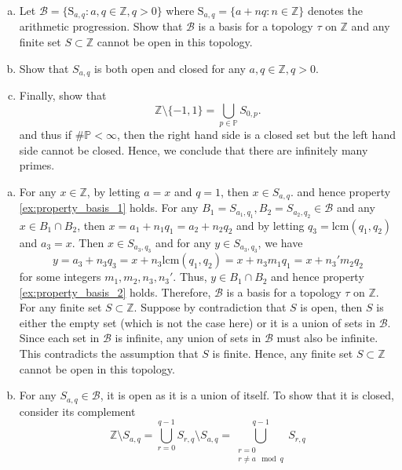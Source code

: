 \documentclass{elegantbook}
\begin{document}
\begin{problemset}[Exercises]
  \begin{enumerate}[(a)]
    \item Let $\mathcal{B} = \{\mathrm{S}_{a, q}: a, q \in \mathbb{Z}, q > 0\}$ where $\mathrm{S}_{a, q} = \{a + nq: n \in \mathbb{Z}\}$ denotes the arithmetic progression. Show that $\mathcal{B}$ is a basis for a topology $\tau$ on $\mathbb{Z}$ and any finite set $S \subset \mathbb{Z}$ cannot be open in this topology.
    \item Show that $S_{a,q}$ is both open and closed for any $a, q \in \mathbb{Z}, q > 0$.
    \item Finally, show that
    \[
      \mathbb{Z} \setminus \{-1, 1\} = \bigcup_{p \in \mathbb{P}} S_{0, p}.
    \]
    and thus if $\#\mathbb{P}<\infty$, then the right hand side is a closed set but the left hand side cannot be closed. Hence, we conclude that there are infinitely many primes.
  \end{enumerate}
  \begin{solution}
    \begin{enumerate}[(a)]
      \item For any $x \in \mathbb{Z}$, by letting $a = x$ and $q = 1$, then $x \in S_{a, q}$. and hence property \ref{ex:property_basis_1} holds. For any $B_1 = S_{a_1, q_1}, B_2 = S_{a_2, q_2} \in \mathcal{B}$ and any $x \in B_1 \cap B_2$, then $x=a_1 + n_1 q_1 = a_2 + n_2 q_2$ and by letting $q_3 = \mathrm{lcm}(q_1, q_2)$ and $a_3 = x$. Then $x \in S_{a_3, q_3}$ and for any $y \in S_{a_3, q_3}$, we have
      \[
        y = a_3 + n_3 q_3 = x + n_3 \mathrm{lcm}(q_1, q_2)=x+ n_3 m_1 q_1 = x + n_3' m_2 q_2
      \]
      for some integers $m_1, m_2, n_3, n_3'$. Thus, $y \in B_1 \cap B_2$ and hence property \ref{ex:property_basis_2} holds. Therefore, $\mathcal{B}$ is a basis for a topology $\tau$ on $\mathbb{Z}$. \\
      For any finite set $S \subset \mathbb{Z}$. Suppose by contradiction that $S$ is open, then $S$ is either the empty set (which is not the case here) or it is a union of sets in $\mathcal{B}$. Since each set in $\mathcal{B}$ is infinite, any union of sets in $\mathcal{B}$ must also be infinite. This contradicts the assumption that $S$ is finite. Hence, any finite set $S \subset \mathbb{Z}$ cannot be open in this topology.
      \item For any $S_{a, q} \in \mathcal{B}$, it is open as it is a union of itself. To show that it is closed, consider its complement
      \[
      \mathbb{Z} \setminus S_{a, q}= \bigcup_{r=0}^{q-1} S_{r, q} \setminus S_{a, q}= \bigcup_{\substack{r=0 \\ r \ne a \mod q}}^{q-1} S_{r, q}
\]
\end{enumerate}
\end{solution}
\end{problemset}
\end{document}
